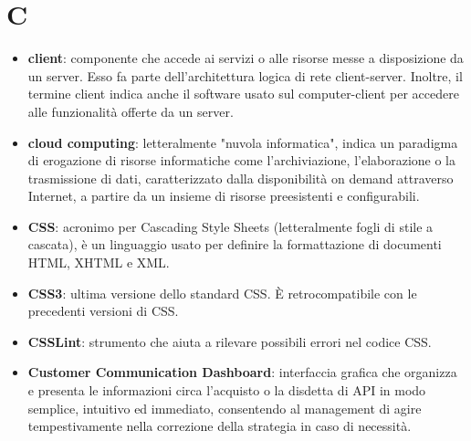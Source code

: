\section{C}
\begin{itemize}
	\item \textbf{client}: componente che accede ai servizi o alle risorse messe a disposizione da un server. Esso fa parte dell'architettura logica di rete client-server. Inoltre, il termine client indica anche il software usato sul computer-client per accedere alle funzionalità offerte da un server.
	\item \textbf{cloud computing}: letteralmente "nuvola informatica", indica un paradigma di erogazione di risorse informatiche come l'archiviazione, l'elaborazione o la trasmissione di dati, caratterizzato dalla disponibilità on demand attraverso Internet, a partire da un insieme di risorse preesistenti e configurabili.
	\item \textbf{CSS}: acronimo per Cascading Style Sheets (letteralmente fogli di stile a cascata), è un linguaggio usato per definire la formattazione di documenti HTML, XHTML e XML.
	\item \textbf{CSS3}: ultima versione dello standard CSS. \MakeUppercase{è} retrocompatibile con le precedenti versioni di CSS.
	\item \textbf{CSSLint}: strumento che aiuta a rilevare possibili errori nel codice CSS.
	\item \textbf{Customer Communication Dashboard}: interfaccia grafica che organizza e presenta le informazioni circa l'acquisto o la disdetta di API in modo semplice, intuitivo ed immediato, consentendo al management di agire tempestivamente nella correzione della strategia in caso di necessità.
\end{itemize}